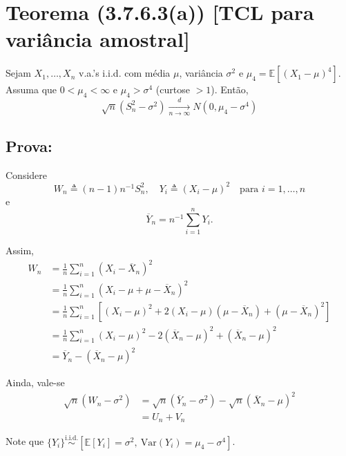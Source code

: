 \section*{Teorema (3.7.6.3(a)) [TCL para variância amostral]}

Sejam $X_1, \dots, X_n$ v.a.'s i.i.d. com média $\mu$, variância $\sigma^2$ e $\mu_4 = \mathbb{E}[(X_1 - \mu)^4]$. Assuma que $0 < \mu_4 < \infty$ e $\mu_4 > \sigma^4$ (curtose $> 1$). Então,
\begin{equation}
\sqrt{n} \left( S_n^2 - \sigma^2 \right) \xrightarrow[n \to \infty]{d} N\left(0, \mu_4 - \sigma^4\right)
\end{equation}

\subsection*{Prova:}

Considere 
\[
W_n \triangleq (n-1) n^{-1} S_n^2, \quad Y_i \triangleq (X_i - \mu)^2 \quad \text{para } i = 1, \dots, n
\]
e 
\[
\overline{Y}_n = n^{-1} \sum_{i=1}^n Y_i.
\]

Assim,
\begin{align}
W_n &= \frac{1}{n} \sum_{i=1}^n (X_i - \overline{X}_n)^2 \\
&= \frac{1}{n} \sum_{i=1}^n \left( X_i - \mu + \mu - \overline{X}_n \right)^2 \\
&= \frac{1}{n} \sum_{i=1}^n \left[ (X_i - \mu)^2 + 2(X_i - \mu)(\mu - \overline{X}_n) + (\mu - \overline{X}_n)^2 \right] \\
&= \frac{1}{n} \sum_{i=1}^n (X_i - \mu)^2 - 2(\overline{X}_n - \mu)^2 + (\overline{X}_n - \mu)^2 \\
&= \overline{Y}_n - (\overline{X}_n - \mu)^2
\end{align}

Ainda, vale-se
\begin{align}
\sqrt{n} \left( W_n - \sigma^2 \right) &= \sqrt{n} \left( \overline{Y}_n - \sigma^2 \right) - \sqrt{n} \left( \overline{X}_n - \mu \right)^2 \\
&= U_n + V_n
\end{align}

Note que $\{ Y_i \} \stackrel{\text{i.i.d.}}{\sim} \left[ \mathbb{E}[Y_i] = \sigma^2, \ \mathrm{Var}(Y_i) = \mu_4 - \sigma^4 \right]$.